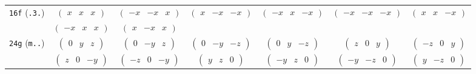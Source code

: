 \documentclass[fleqn,9pt,landscape]{jsarticle}
\begin{document}
\begin{center}
\begin{longtable}{ccccccc}
{\tt 16f} ({\tt .3.}) & $ \begin{pmatrix} x & x & x \end{pmatrix} $ & $ \begin{pmatrix} - x & - x & x \end{pmatrix} $ & $ \begin{pmatrix} x & - x & - x \end{pmatrix} $ & $ \begin{pmatrix} - x & x & - x \end{pmatrix} $ & $ \begin{pmatrix} - x & - x & - x \end{pmatrix} $ & $ \begin{pmatrix} x & x & - x \end{pmatrix} $ \\
& $ \begin{pmatrix} - x & x & x \end{pmatrix} $ & $ \begin{pmatrix} x & - x & x \end{pmatrix} $ & $  $ & $  $ & $  $ & $  $ \\ \hline
{\tt 24g} ({\tt m..}) & $ \begin{pmatrix} 0 & y & z \end{pmatrix} $ & $ \begin{pmatrix} 0 & - y & z \end{pmatrix} $ & $ \begin{pmatrix} 0 & - y & - z \end{pmatrix} $ & $ \begin{pmatrix} 0 & y & - z \end{pmatrix} $ & $ \begin{pmatrix} z & 0 & y \end{pmatrix} $ & $ \begin{pmatrix} - z & 0 & y \end{pmatrix} $ \\
& $ \begin{pmatrix} z & 0 & - y \end{pmatrix} $ & $ \begin{pmatrix} - z & 0 & - y \end{pmatrix} $ & $ \begin{pmatrix} y & z & 0 \end{pmatrix} $ & $ \begin{pmatrix} - y & z & 0 \end{pmatrix} $ & $ \begin{pmatrix} - y & - z & 0 \end{pmatrix} $ & $ \begin{pmatrix} y & - z & 0 \end{pmatrix} $ \\ \hline

\end{longtable}
\end{center}
\end{document}
